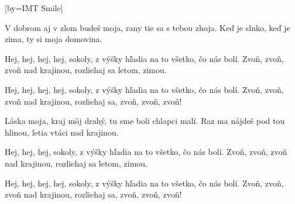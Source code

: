 [by={IMT Smile}]

\beginverse{}
V dobrom aj v zlom budeš moja,
rany tie sa s tebou zhoja.
Keď je slnko, keď je zima,
ty si moja domovina.
\endverse{}

\beginchorus{}
Hej, hej, hej, hej, sokoly,
z výšky hľadia na to všetko, čo nás bolí.
Zvoň, zvoň, zvoň nad krajinou,
rozliehaj sa letom, zimou.
\endchorus{}

\beginchorus{}
\chordsoff{}
Hej, hej, hej, hej, sokoly,
z výšky hľadia na to všetko, čo nás bolí.
Zvoň, zvoň, zvoň nad krajinou,
rozliehaj sa, zvoň, zvoň, zvoň!
\chordson{}
\endchorus{}

\beginverse{}
\chordsoff{}
Láska moja, kraj môj drahý,
tu sme boli chlapci malí.
Raz ma nájdeš pod tou hlinou,
letia vtáci nad krajinou.
\chordson{}
\endverse{}

\beginchorus{}
\chordsoff{}
Hej, hej, hej, sokoly,
z výšky hľadia na to všetko, čo nás bolí.
Zvoň, zvoň, zvoň nad krajinou,
rozliehaj sa letom, zimou.
\chordson{}
\endchorus{}

\beginchorus{}
\chordsoff{}
Hej, hej, hej, hej, sokoly,
z výšky hľadia na to všetko, čo nás bolí.
Zvoň, zvoň, zvoň nad krajinou,
rozliehaj sa, zvoň, zvoň, zvoň!
\chordson{}
\endchorus{}

\endsong{}

